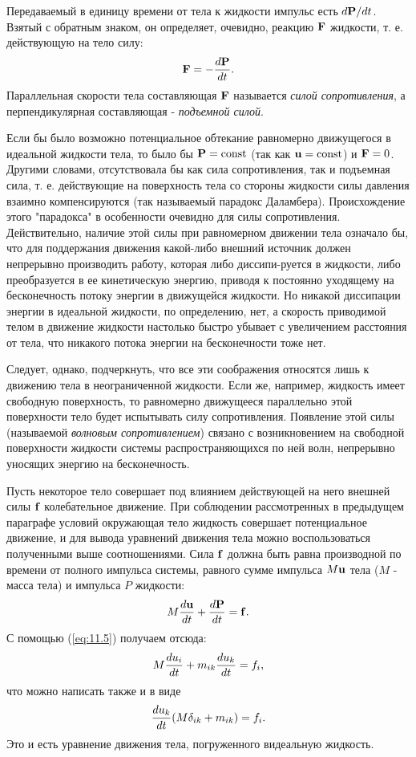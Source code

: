Передаваемый в единицу времени от тела к жидкости импульс есть $d\mathbf{P}/dt$.
Взятый с обратным знаком, он определяет, очевидно, реакцию $\mathbf{F}$ жидкости,
т. е. действующую на тело силу:
\begin{equation}
   \label{eq:11.7}
       \mathbf{F} = - \frac{d{\mathbf{P}}}{d{t}}.
\end{equation}
Параллельная скорости тела составляющая $\mathbf{F}$ называется \textit{силой
сопротивления}, а перпендикулярная составляющая - \textit{подъемной силой}.

Если бы было возможно потенциальное обтекание равномерно движущегося в идеальной
жидкости тела, то было бы $\mathbf{P} = \mathop{\mathrm{const}}\nolimits$ (так как $\mathbf{u} = \mathop{\mathrm{const}}\nolimits$) и
$\mathbf{F} = 0$. Другими словами, отсутствовала бы как сила сопротивления, так и
подъемная сила, т. е. действующие на поверхность тела со стороны жидкости силы
давления взаимно компенсируются (так называемый парадокс Даламбера).
Происхождение этого "парадокса" в особенности очевидно для силы сопротивления.
Действительно, наличие этой силы при равномерном движении тела означало бы, что
для поддержания движения какой-либо внешний источник должен непрерывно
производить работу, которая либо диссипи-руется в жидкости, либо преобразуется в
ее кинетическую энергию, приводя к постоянно уходящему на бесконечность потоку
энергии в движущейся жидкости. Но никакой диссипации энергии в идеальной
жидкости, по определению, нет, а скорость приводимой телом в движение жидкости
настолько быстро убывает с увеличением расстояния от тела, что никакого потока
энергии на бесконечности тоже нет.

Следует, однако, подчеркнуть, что все эти соображения относятся лишь к движению
тела в неограниченной жидкости. Если же, например, жидкость имеет свободную
поверхность, то равномерно движущееся параллельно этой поверхности тело будет
испытывать силу сопротивления. Появление этой силы (называемой \textit{волновым
сопротивлением}) связано с возникновением на свободной поверхности жидкости
системы распространяющихся по ней волн, непрерывно уносящих энергию на
бесконечность.

Пусть некоторое тело совершает под влиянием действующей на него внешней силы
$\mathbf{f}$ колебательное движение. При соблюдении рассмотренных в предыдущем
параграфе условий окружающая тело жидкость совершает потенциальное движение, и
для вывода уравнений движения тела можно воспользоваться полученными выше
соотношениями. Сила $\mathbf{f}$ должна быть равна производной по времени от
полного импульса системы, равного сумме импульса $M\mathbf{u}$ тела ($M$ - масса
тела) и импульса $P$ жидкости:
\[
    M \frac{d{\mathbf{u}}}{d{t}} + \frac{d{\mathbf{P}}}{d{t}} = \mathbf{f}.
\]
С помощью (\ref{eq:11.5}) получаем отсюда:
\[
   M \frac{d{u_i}}{d{t}} + m_{ik}\frac{d{u_k}}{d{t}} = f_i ,
\]
что можно написать также и в виде
\begin{equation}
   \label{eq:11.8}
       \frac{d{u_k}}{d{t}}(M \delta_{ik} + m_{ik}) = f_i.
\end{equation}
Это и есть уравнение движения тела, погруженного видеальную жидкость.

